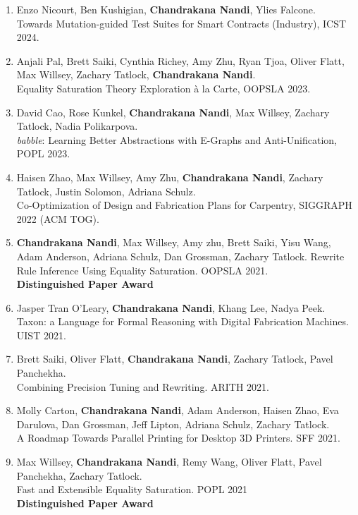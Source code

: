 \documentclass[margin, 10pt]{res} %
\begin{document}
\begin{resume}
\begin{enumerate}
  \item Enzo Nicourt, Ben Kushigian, \textbf{Chandrakana Nandi}, Ylies Falcone. \\
    Towards Mutation-guided Test Suites for Smart Contracts (Industry), ICST 2024.

  \item Anjali Pal, Brett Saiki, Cynthia Richey, Amy Zhu, Ryan Tjoa, Oliver Flatt, Max Willsey, Zachary Tatlock, \textbf{Chandrakana Nandi}. \\
    Equality Saturation Theory Exploration à la Carte, OOPSLA 2023.

  \item David Cao, Rose Kunkel, \textbf{Chandrakana Nandi}, Max Willsey, Zachary Tatlock, Nadia Polikarpova. \\
    \textit{babble}: Learning Better Abstractions with E-Graphs and Anti-Unification, POPL 2023.

  \item Haisen  Zhao, Max Willsey, Amy Zhu, \textbf{Chandrakana Nandi}, Zachary Tatlock, Justin Solomon, Adriana Schulz. \\
    Co-Optimization of Design and Fabrication Plans for Carpentry, SIGGRAPH 2022 (ACM TOG).

  \item \textbf{Chandrakana Nandi}, Max Willsey, Amy zhu, Brett Saiki, Yisu Wang, Adam Anderson, Adriana Schulz, Dan Grossman, Zachary Tatlock.
    Rewrite Rule Inference Using Equality Saturation. OOPSLA 2021. \\
    \textbf{Distinguished Paper Award}

  \item Jasper Tran O'Leary, \textbf{Chandrakana Nandi}, Khang Lee, Nadya Peek. \\
  Taxon: a Language for Formal Reasoning with Digital Fabrication Machines. UIST 2021.

\item Brett Saiki, Oliver Flatt, \textbf{Chandrakana Nandi}, Zachary Tatlock, Pavel Panchekha. \\
  Combining Precision Tuning and Rewriting. ARITH 2021.

\item Molly Carton, \textbf{Chandrakana Nandi}, Adam Anderson, Haisen Zhao, Eva Darulova, Dan Grossman, Jeff Lipton, Adriana Schulz, Zachary Tatlock. \\
  A Roadmap Towards Parallel Printing for Desktop 3D Printers. SFF 2021.

\item Max Willsey, \textbf{Chandrakana Nandi}, Remy Wang, Oliver Flatt, Pavel Panchekha, Zachary Tatlock. \\
    Fast and Extensible Equality Saturation. POPL 2021 \\
    \textbf{Distinguished Paper Award}


\end{enumerate}
\end{resume}
\end{document}
